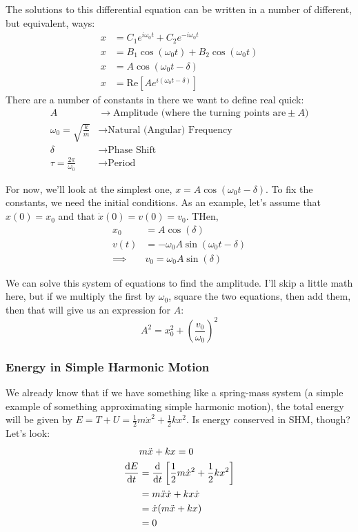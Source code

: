\documentclass[a4paper]{article}
\begin{document}
The solutions to this differential equation can be written in a number of
different, but equivalent, ways:
\begin{align*}
	x&=C_1e^{i\omega_0t}+C_2e^{-i\omega_0t}\\
	x&=B_1\cos(\omega_0t)+B_2\cos(\omega_0t)\\
	x&=A\cos(\omega_0t-\delta)\\
	x&=\mathrm{Re}[Ae^{i(\omega_0t-\delta)}]
\end{align*}
There are a number of constants in there we want to define real quick:
\begin{align*}
	A &\to \text{Amplitude (where the turning points are}\pm A\text{)}\\
	\omega_0=\sqrt{\frac{k}{m}} &\to \text{Natural (Angular) Frequency}\\
	\delta &\to \text{Phase Shift}\\
	\tau=\frac{2\pi}{\omega_0} &\to \text{Period}
\end{align*}

For now, we'll look at the simplest one, $x= A\cos(\omega_0t-\delta)$. To fix
the constants, we need the initial conditions. As an example, let's assume that
$x(0) = x_0$ and that $\dot{x}(0) = v(0) =v_0$. THen,
\begin{align*}
	x_0 &= A\cos(\delta)\\
	v(t) &= -\omega_0A\sin(\omega_0t-\delta)\\
	\implies& v_0 = \omega_0A\sin(\delta)
\end{align*}

We can solve this system of equations to find the amplitude. I'll skip a little
math here, but if we multiply the first by $\omega_0$, square the two
equations, then add them, then that will give us an expression for $A$:
\[
	A^2 = x_0^2 + \left(\frac{v_0}{\omega_0}\right)^2
\]

\subsubsection{Energy in Simple Harmonic Motion}
We already know that if we have something like a spring-mass system (a
simple example of something approximating simple harmonic motion), the total
energy will be given by $E=T+U=\frac{1}{2}m\dot{x}^2+\frac{1}{2}kx^2$.
Is energy conserved in SHM, though? Let's look:
\begin{align*}
	&m\ddot{x}+kx=0\\
	\frac{\mathrm{d} E}{\mathrm{d} t} &= \frac{\mathrm{d}}{\mathrm{d} t}\left[\frac{1}{2}m\dot{x}^2+
	\frac{1}{2}kx^2\right]\\
	&= m\ddot{x}\dot{x}+kx\dot{x}\\
	&=\dot{x}(m\ddot{x}+kx)\\
	&=0
\end{align*}
\end{document}
